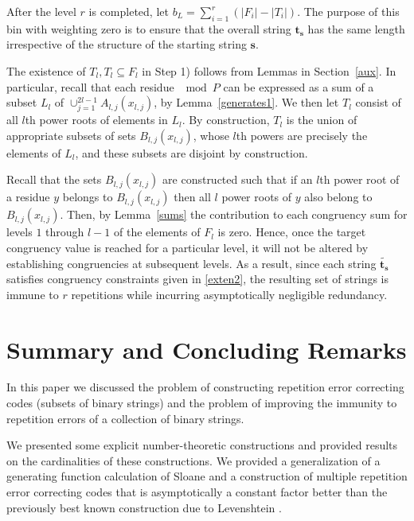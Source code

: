 \documentclass[12pt]{article} \pagestyle{plain} \topmargin
\begin{document}
After the level $r$ is completed, let $b_L=\sum_{i=1}^r (|F_i|-
|T_i|)$. The purpose of this bin with weighting zero is to ensure
that the overall string $\mathbf{t_s}$ has the same length
irrespective of the structure of the starting string $\mathbf{s}$.

The existence of $T_l, T_l \subseteq F_l$ in Step 1) follows from
Lemmas in Section~\ref{aux}. In particular, recall that each residue
$\mod P$ can be expressed as a sum of a subset $L_{l}$ of
$\cup_{j=1}^{2l-1} A_{l,j}(x_{l,j})$, by Lemma~\ref{generates1}. We
then let $T_l$ consist of all $l$th power roots of elements in
$L_l$. By construction, $T_l$ is the union of appropriate subsets of
sets $B_{l,j}(x_{l,j})$, whose $l$th powers are precisely the
elements of $L_l$, and these subsets are disjoint by construction.





Recall that the sets $B_{l,j}(x_{l,j})$ are constructed such that if
an $l$th power root of a residue $y$ belongs to $B_{l,j}(x_{l,j})$
then all $l$ power roots of $y$ also belong to $B_{l,j}(x_{l,j})$.
Then, by Lemma~\ref{sums} the contribution to each congruency sum
for levels $1$ through $l-1$ of the elements of $F_l$ is zero.
Hence, once the target congruency value is reached for a particular
level, it will not be altered by establishing congruencies at
subsequent levels. As a result, since each string
$\tilde{\mathbf{t_s}}$ satisfies congruency constraints given in
\eqref{exten2},  the resulting set of strings is immune to $r$
repetitions while incurring asymptotically negligible redundancy.

\section{Summary and Concluding Remarks}


In this paper  we discussed the problem of constructing repetition
error correcting codes (subsets of binary strings) and the problem
of improving the immunity to repetition errors of a collection of
binary strings.

We presented some explicit number-theoretic constructions and
provided results on the cardinalities of these constructions. We
provided a generalization of a generating function calculation of
Sloane \cite{sloane:00} and a construction of multiple repetition
error correcting codes that is asymptotically a constant factor
better than the previously best known construction due to
Levenshtein \cite{lev:66a}.
\end{document}
